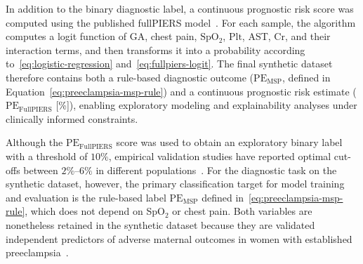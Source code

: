 \documentclass[diagnostics,article,submit,pdftex,moreauthors]{Definitions/mdpi}
\begin{document}
In addition to the binary diagnostic label, a continuous prognostic
risk score was computed using the published fullPIERS
model~\cite{fullpiers_2011}. For each sample, the algorithm computes a
logit function of \ac{GA}, chest pain, $\mathrm{SpO_2}$,
$\mathrm{Plt}$, \ac{AST}, $\mathrm{Cr}$, and their interaction terms,
and then transforms it into a probability according
to~\eqref{eq:logistic-regression} and~\eqref{eq:fullpiers-logit}.
The final synthetic dataset therefore contains both a rule-based
diagnostic outcome ($\mathrm{PE}_{\mathrm{MSP}}$, defined in
Equation~\eqref{eq:preeclampsia-msp-rule}) and a continuous prognostic
risk estimate ($\mathrm{PE}_{\mathrm{FullPIERS}}$ [\%]), enabling exploratory
modeling and explainability analyses under clinically informed
constraints.

Although the $\mathrm{PE}_{\mathrm{FullPIERS}}$ score was used to
obtain an exploratory binary label with a threshold of $10\%$, empirical
validation studies have reported optimal cut-offs between $2\%\text{–}6\%$
in different populations~\cite{long2025fullpiers,teichmann2025fullpiers,elongi2025fullpiers}.
For the diagnostic task on the synthetic dataset, however, the primary
classification target for model training and evaluation is the rule-based
label $\mathrm{PE}_{\mathrm{MSP}}$ defined in~\eqref{eq:preeclampsia-msp-rule},
which does not depend on SpO$_2$ or chest pain. Both variables are
nonetheless retained in the synthetic dataset because they are validated
independent predictors of adverse maternal outcomes in women with
established preeclampsia~\cite{millman2011spo2,elongi2025fullpiers}.

\end{document}
